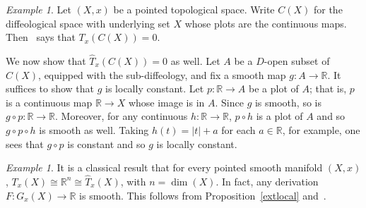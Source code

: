 \documentclass[12pt]{amsart}
\theoremstyle{remark}
\newtheorem{ex}[de]{Example}
\newcommand{\ra}{\to}
\def \R{\mathbb{R}}
\begin{document}
\begin{ex}\label{top}
Let $(X,x)$ be a pointed topological space.
Write $C(X)$ for the diffeological space with underlying set $X$
whose plots are the continuous maps.
Then~\cite[Proposition~4.3]{He} says that $T_x(C(X))=0$.

We now show that $\hat{T}_x(C(X))=0$ as well.
Let $A$ be a $D$-open subset of $C(X)$, equipped with the sub-diffeology,
and fix a smooth map $g : A \to \R$.
It suffices to show that $g$ is locally constant.
Let $p : \R \to A$ be a plot of $A$;
that is, $p$ is a continuous map $\R \to X$ whose image is in $A$.
Since $g$ is smooth, so is $g \circ p : \R \to \R$.
Moreover, for any continuous $h : \R \to \R$, $p \circ h$ is a plot of $A$
and so $g \circ p \circ h$ is smooth as well.
Taking $h(t) = |t|+a$ for each $a \in \R$, for example,
one sees that $g \circ p$ is constant and so $g$ is locally constant.
\end{ex}


\begin{ex}\label{smoothmanifolds}
It is a classical result that for every pointed smooth manifold $(X,x)$,
$T_x(X) \cong \R^n \cong \hat{T}_x(X)$, with $n = \dim(X)$.
In fact, any derivation $F:G_x(X) \ra \R$ is smooth.
This follows from Proposition~\ref{extlocal} and~\cite[Lemma~4.3]{CSW}.
\end{ex}
\end{document}
